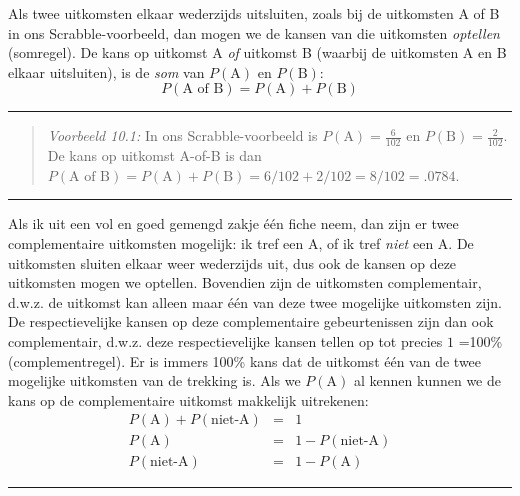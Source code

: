 \documentclass[
]{book}
\begin{document}
Als twee uitkomsten elkaar wederzijds uitsluiten, zoals bij de
uitkomsten A of B in ons Scrabble-voorbeeld, dan mogen we de kansen van
die uitkomsten \emph{optellen} (somregel). De kans op uitkomst A \emph{of}
uitkomst B (waarbij de uitkomsten A en B elkaar uitsluiten), is de \emph{som}
van \(P(\textrm{A})\) en \(P(\textrm{B})\):
\begin{equation}
    P(\textrm{A of B}) = P(\textrm{A}) + P(\textrm{B})
  \label{eq:kans-somregel}
\end{equation}

\begin{center}\rule{0.5\linewidth}{0.5pt}\end{center}

\begin{quote}
\emph{Voorbeeld 10.1:}
In ons Scrabble-voorbeeld is \(P(\textrm{A})=\frac{6}{102}\) en
\(P(\textrm{B})=\frac{2}{102}\). De kans op uitkomst A-of-B is dan
\(P(\textrm{A of B})=P(\textrm{A})+P(\textrm{B})=6/102+2/102=8/102=.0784\).
\end{quote}

\begin{center}\rule{0.5\linewidth}{0.5pt}\end{center}

Als ik uit een vol en goed gemengd zakje één fiche neem, dan zijn er
twee complementaire uitkomsten mogelijk: ik tref een A, of ik tref
\emph{niet} een A. De uitkomsten sluiten elkaar weer wederzijds uit, dus ook
de kansen op deze uitkomsten mogen we optellen. Bovendien zijn de
uitkomsten complementair, d.w.z. de uitkomst kan alleen maar één van
deze twee mogelijke uitkomsten zijn. De respectievelijke kansen op deze
complementaire gebeurtenissen zijn dan ook complementair, d.w.z. deze
respectievelijke kansen tellen op tot precies \(1\) =100\%
(complementregel). Er is immers 100\% kans dat de uitkomst één van de
twee mogelijke uitkomsten van de trekking is. Als we \(P(\textrm{A})\) al
kennen kunnen we de kans op de complementaire uitkomst makkelijk
uitrekenen:
\begin{align}
    P(\textrm{A}) + P(\textrm{niet-A}) & = & 1\\
    P(\textrm{A}) & = & 1 - P(\textrm{niet-A})\\
    P(\textrm{niet-A}) & = & 1 - P(\textrm{A})
    \label{eq:complementregel}
\end{align}

\begin{center}\rule{0.5\linewidth}{0.5pt}\end{center}
\end{document}
